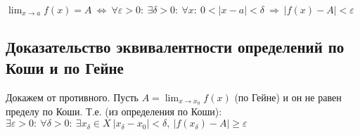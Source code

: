 $\displaystyle \lim_{x \to a} f(x) = A \ \Leftrightarrow \ \forall \varepsilon > 0 : \ \exists \delta > 0: \ \forall x : \ 0 < |x - a| < \delta \ \Rightarrow \ |f(x) - A| < \varepsilon $\newline

\subsection{Доказательство эквивалентности определений по Коши и по Гейне}
Докажем от противного. Пусть $\displaystyle A = \lim_{x \to x_0} f(x)$ (по Гейне) и он не равен пределу по Коши. Т.е. (из определения по Коши):\newline
$\exists \varepsilon > 0:\ \forall \delta > 0:\ \exists x_{\delta} \in X\ |x_{\delta} - x_0| < \delta,\  |f(x_{\delta}) - A| \geq \varepsilon$ \newline
